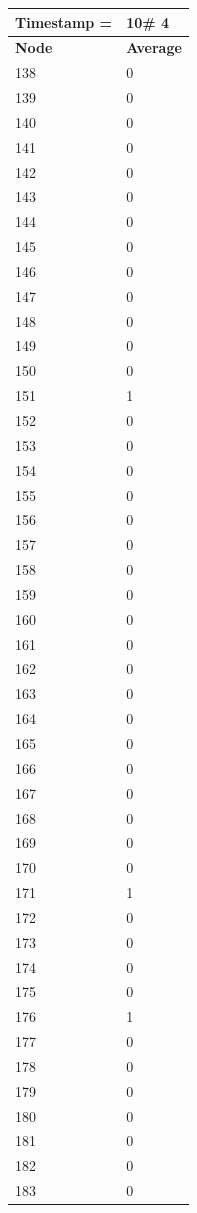 \begin{tabular}{|l||l|}
\hline
\textbf{Timestamp =} & \textbf{10}\# 4\\\hline
	\textbf{Node} & \textbf{Average} \\ \hline
\hline
	138 & 0 \\ \hline
	139 & 0 \\ \hline
	140 & 0 \\ \hline
	141 & 0 \\ \hline
	142 & 0 \\ \hline
	143 & 0 \\ \hline
	144 & 0 \\ \hline
	145 & 0 \\ \hline
	146 & 0 \\ \hline
	147 & 0 \\ \hline
	148 & 0 \\ \hline
	149 & 0 \\ \hline
	150 & 0 \\ \hline
	151 & 1 \\ \hline
	152 & 0 \\ \hline
	153 & 0 \\ \hline
	154 & 0 \\ \hline
	155 & 0 \\ \hline
	156 & 0 \\ \hline
	157 & 0 \\ \hline
	158 & 0 \\ \hline
	159 & 0 \\ \hline
	160 & 0 \\ \hline
	161 & 0 \\ \hline
	162 & 0 \\ \hline
	163 & 0 \\ \hline
	164 & 0 \\ \hline
	165 & 0 \\ \hline
	166 & 0 \\ \hline
	167 & 0 \\ \hline
	168 & 0 \\ \hline
	169 & 0 \\ \hline
	170 & 0 \\ \hline
	171 & 1 \\ \hline
	172 & 0 \\ \hline
	173 & 0 \\ \hline
	174 & 0 \\ \hline
	175 & 0 \\ \hline
	176 & 1 \\ \hline
	177 & 0 \\ \hline
	178 & 0 \\ \hline
	179 & 0 \\ \hline
	180 & 0 \\ \hline
	181 & 0 \\ \hline
	182 & 0 \\ \hline
	183 & 0 \\ \hline
\end{tabular}
